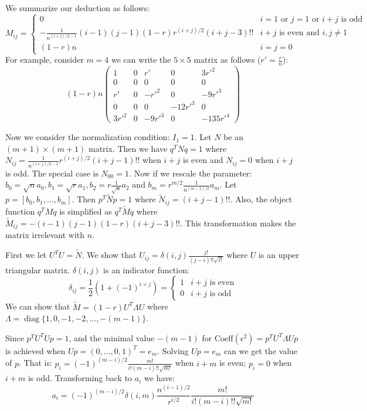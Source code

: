 \documentclass{article}
\DeclareMathOperator*{\diag}{diag}
\begin{document}
We summarize our deduction as follows:
\begin{equation}
M_{ij} = \begin{cases} 0 & i=1 \textrm{ or } j=1 \textrm{ or } i + j \textrm{ is odd} \\
 -\frac{1}{n^{(i+j)/2-1}}(i-1)(j-1) (1-r)r^{(i+j)/ 2 } (i+j-3)!! & i+j \textrm{ is even and } i,j \neq 1 \\
(1-r)n & i=j=0
\end{cases}
\end{equation}
For example, consider $m = 4$ we can write the $ 5 \times 5 $ matrix as follows ($r'=\frac{r}{n}$):
$$
(1-r)n\begin{pmatrix}
1 & 0 & r'  & 0 & 3r'^2\\
0 & 0 & 0  & 0 & 0\\
r' &  0 & - r'^2 & 0 & -9 r'^3 \\
0 & 0 & 0 & -12r'^3 & 0 \\
3r'^2 & 0 & -9 r'^3 & 0 & -135r'^4 
\end{pmatrix}
$$

Now we consider the normalization condition: $I_1 = 1$. Let $N$ be an $(m+1) \times (m+1)$ matrix.
Then we have $q^T N q = 1$ where $N_{ij} =\frac{1}{n^{(i+j)/2-1}}r^{(i+j) / 2} (i+j -1)!!$ when $i+j$ is even and $N_{ij} = 0$ when $i+j$ is odd. The special case is $N_{00} = 1$. Now if we rescale the parameter: $b_0 =  \sqrt{n}a_0, b_1 = \sqrt{r} a_1, b_2 = r \frac{1}{\sqrt{n}}a_2$ and $b_m = r^{m/2} \frac{1}{n^{(m-1)/2}}a_m$. Let $p = [b_0, b_1, \dots, b_m]$. Then $p^T \widetilde{N} p =1$ where $\widetilde{N}_{ij} =  (i+j -1)!!$. Also, the object function $q^T M q$ is simplified as $q^T \widetilde{M} q$ where $\widetilde{M}_{ij} =  -(i-1)(j-1)(1-r) (i+j-3)!! $. This transformation makes the matrix irrelevant with $n$.

First we let $U^T U = \widetilde{N}$. We show that $U_{ij} = \delta(i,j)\frac{j!}{(j-i)!!\sqrt{i!}}$ where $U$ is an upper triangular matrix. $\delta(i,j)$ is an indicator function:
\begin{equation}
\delta_{ij} = \frac{1}{2}(1+(-1)^{i+j})=\begin{cases}
1 & i+j \textrm{ is even} \\
0 & i+j \textrm{ is odd}
\end{cases}
\end{equation}
We can show that $\widetilde{M} = (1-r)U^T \Lambda U$ where $\Lambda = \diag\{1,0, -1, -2, \dots, -(m-1)\}$.

Since $p^T U^T U p = 1$, and the minimal value $-(m-1)$ for $\textrm{Coeff}(\epsilon^2) = p^T U^T \Lambda U p $ is achieved when $U p = (0, \dots, 0, 1)^T = e_m$. Solving $ U p = e_m $ can we get the value of $p$. That is: $p_i = (-1)^{(m-i)/2} \frac{m!}{i!(m-i)!! \sqrt{m!}} $ when $i+m$ is even; $p_i = 0 $ when $i+m$ is odd. Transforming back to $a_i$ we have:
\begin{equation}
a_i =(-1)^{(m-i)/2} \delta(i,m) \frac{n^{(i-1)/2}}{r^{i/2}} \frac{m!}{i!(m-i)!! \sqrt{m!}}
\end{equation}
\end{document}
